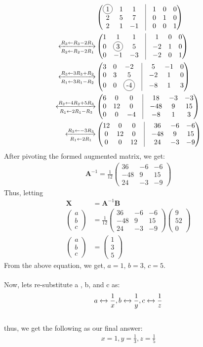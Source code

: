 \documentclass[journal,12.00pt,twocolumn]{IEEEtran}
\newcommand*\circled[1]{\tikz[baseline=(char.base)]{
    \node[shape=circle,draw,inner sep=2pt] (char) {#1};}}
\let\vec\mathbf
\newcommand{\myvec}[1]{\ensuremath{\begin{pmatrix}#1\end{pmatrix}}}
\begin{document}
\begin{align}
	&\myvec{\circled{1} & 1 & 1 & \vrule & 1 & 0 & 0\\ 2 & 5 & 7 & \vrule & 0 & 1 & 0\\ 2 & 1 & -1 & \vrule & 0 & 0 & 1}\\
	\xleftrightarrow [R_2\leftarrow R_2 - 2R_1]{R_3\leftarrow R_3 - 2R_1}
	&\myvec{1 & 1 & 1 & \vrule & 1 & 0 & 0\\ 0 & \circled{3} & 5 & \vrule & -2 & 1 & 0\\ 0 & -1 & -3 & \vrule & -2 & 0 & 1}\\
	\xleftrightarrow [R_1\leftarrow 3R_1 - R_2]{R_3\leftarrow 3R_3 + R_2}
	&\myvec{3 & 0 & -2 & \vrule & 5 & -1 & 0\\ 0 & 3 & 5 & \vrule & -2 & 1 & 0\\ 0 & 0 & \circled{-4} & \vrule & -8 & 1 & 3}\\
  \xleftrightarrow [R_1\leftarrow 2R_1 - R_3]{R_2\leftarrow 4R_2 + 5R_3}
	&\myvec{6 & 0 & 0 & \vrule & 18 & -3 & -3\\ 0 & 12 & 0 & \vrule & -48 & 9 & 15\\ 0 & 0 & -4 & \vrule & -8 & 1 & 3}\\
	\xleftrightarrow [R_1\leftarrow 2R_1]{R_3\leftarrow -3R_3}
	&\myvec{12 & 0 & 0 & \vrule & 36 & -6 & -6\\ 0 & 12 & 0 & \vrule & -48 & 9 & 15\\ 0 & 0 & 12 & \vrule & 24 & -3 & -9}
  \end{align}
  After pivoting the formed augmented matrix, we get:
\begin{align}
	\vec{A}^{-1} = \frac{1}{12}\myvec{ 36 & -6 & -6\\ -48 & 9 & 15\\ 24 & -3 & -9}
\end{align}
Thus, letting 
\begin{align}
	\vec{X} &= \vec{A}^{-1}\vec{B}\\
	\myvec{a\\b\\c}&=\frac{1}{12}\myvec{ 36 & -6 & -6\\ -48 & 9 & 15\\ 24 & -3 & -9}\myvec{9\\52\\0}\\ 
	\myvec{a\\b\\c}&= \myvec{ 1 \\ 3 \\ 5}
\end{align}
From the above equation, we get, $a=1$, $b=3$, $c=5$.\\
\medskip\\
Now, lets re-substitute a , b, and c as:\\
\begin{align}
    a\xleftrightarrow[]{}\frac{1}{x}, b\xleftrightarrow[]{}\frac{1}{y}, c\xleftrightarrow[]{}\frac{1}{z}
\end{align}
\medskip\\
thus, we get the following as our final answer:
\begin{align}
  x=1, y=\frac{1}{3}, z=\frac{1}{5}
\end{align}
\end{document}
